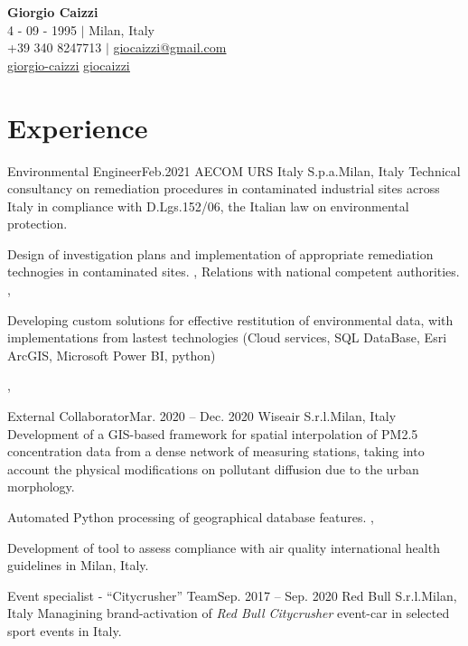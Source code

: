 \documentclass[letterpaper,11pt]{article}
\begin{document}
\begin{center}
  \textbf{\Huge \bfseries Giorgio Caizzi} \\
  \vspace{2pt} 4 - 09 - 1995 $|$ Milan, Italy \\
  \small +39 340 8247713 $|$ \href{mailto:x@x.com}{\underline{giocaizzi@gmail.com}}\\
  \faLinkedinSquare{ : }\href{https://linkedin.com/in/giorgio-caizzi/}{\underline{giorgio-caizzi}}
  \faGithubSquare{ : }\href{https://www.github.com/giocaizzi/}{\underline{giocaizzi}}\\
\end{center}

\section{Experience}
\sectionElementListStart

\sectionElement
{Environmental Engineer}{Feb.2021}
{AECOM URS Italy S.p.a.}{Milan, Italy}
{
  Technical consultancy on remediation procedures in contaminated industrial sites across Italy
  in compliance with D.Lgs.152/06, the Italian law on environmental protection.
}
{
  {
      Design of investigation plans and implementation of appropriate remediation technogies in contaminated sites.
    },
  {
      Relations with national competent authorities.
    },
  {
      Developing custom solutions for effective restitution of environmental data, with implementations from lastest technologies (Cloud services, SQL DataBase, Esri ArcGIS, Microsoft Power BI, python)

    },
}

\sectionElement
{External Collaborator}{Mar. 2020 -- Dec. 2020}
{Wiseair S.r.l.}{Milan, Italy}
{
  Development of a GIS-based framework for spatial interpolation of PM2.5 concentration
  data from a dense network of measuring stations, taking into account the physical
  modifications on pollutant diffusion due to the urban morphology.
}
{
  {
      Automated Python processing of geographical database features.
    },
  {
      Development of tool to assess compliance with air quality international health guidelines
      in Milan, Italy.

    }
}

\sectionElement
{Event specialist - “Citycrusher” Team}{Sep. 2017 -- Sep. 2020}
{Red Bull S.r.l.}{Milan, Italy}
{Managining brand-activation of \textit{Red Bull Citycrusher} event-car in selected sport
  events in Italy.}
{}
\end{document}
